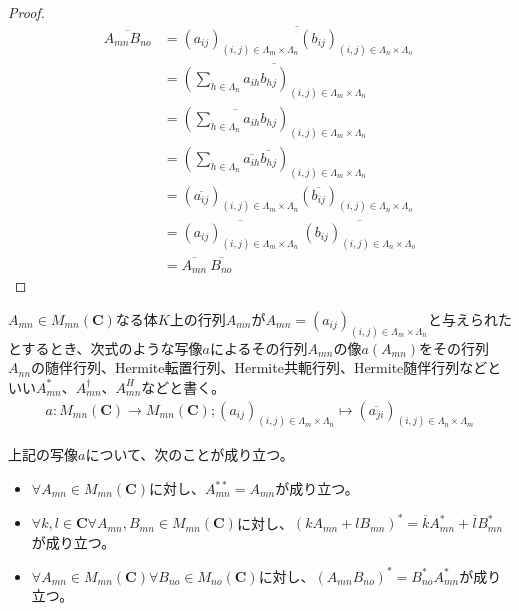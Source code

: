\documentclass[dvipdfmx]{jsarticle}
\begin{document}
\begin{proof}
\begin{align*}
\overline{A_{mn}B_{no}} &= \overline{\left( a_{ij} \right)_{(i,j) \in \varLambda_{m} \times \varLambda_{n}}\left( b_{ij} \right)_{(i,j) \in \varLambda_{n} \times \varLambda_{o}}}\\
&= \overline{\left( \sum_{h \in \varLambda_{n}} {a_{ih}b_{hj}} \right)_{(i,j) \in \varLambda_{m} \times \varLambda_{n}}}\\
&= \left( \overline{\sum_{h \in \varLambda_{n}} {a_{ih}b_{hj}}} \right)_{(i,j) \in \varLambda_{m} \times \varLambda_{n}}\\
&= \left( \sum_{h \in \varLambda_{n}} {\overline{a_{ih}}\overline{b_{hj}}} \right)_{(i,j) \in \varLambda_{m} \times \varLambda_{n}}\\
&= \left( \overline{a_{ij}} \right)_{(i,j) \in \varLambda_{m} \times \varLambda_{n}}\left( \overline{b_{ij}} \right)_{(i,j) \in \varLambda_{n} \times \varLambda_{o}}\\
&= \overline{\left( a_{ij} \right)_{(i,j) \in \varLambda_{m} \times \varLambda_{n}}}\ \overline{\left( b_{ij} \right)_{(i,j) \in \varLambda_{n} \times \varLambda_{o}}}\\
&= \overline{A_{mn}}\ \overline{B_{no}}
\end{align*}
\end{proof}
\begin{dfn}
$A_{mn} \in M_{mn}\left( \mathbf{C} \right)$なる体$K$上の行列$A_{mn}$が$A_{mn} = \left( a_{ij} \right)_{(i,j) \in \varLambda_{m} \times \varLambda_{n}}$と与えられたとするとき、次式のような写像$a$によるその行列$A_{mn}$の像$a\left( A_{mn} \right)$をその行列$A_{nn}$の随伴行列、Hermite転置行列、Hermite共軛行列、Hermite随伴行列などといい$A_{mn}^{*}$、$A_{mn}^{\dagger}$、$A_{mn}^{H}$などと書く。
\begin{align*}
a:M_{mn}\left( \mathbf{C} \right) \rightarrow M_{mn}\left( \mathbf{C} \right);\left( a_{ij} \right)_{(i,j) \in \varLambda_{m} \times \varLambda_{n}} \mapsto \left( \overline{a_{ji}} \right)_{(i,j) \in \varLambda_{n} \times \varLambda_{m}}
\end{align*}
\end{dfn}
\begin{thm}\label{2.1.3.10}
上記の写像$a$について、次のことが成り立つ。
\begin{itemize}
\item
  $\forall A_{mn} \in M_{mn}\left( \mathbf{C} \right)$に対し、$A_{mn}^{**} = A_{mn}$が成り立つ。
\item
  $\forall k,l \in \mathbf{C}\forall A_{mn},B_{mn} \in M_{mn}\left( \mathbf{C} \right)$に対し、$\left( kA_{mn} + lB_{mn} \right)^{*} = \overline{k}A_{mn}^{*} + \overline{l}B_{mn}^{*}$が成り立つ。
\item
  $\forall A_{mn} \in M_{mn}\left( \mathbf{C} \right)\forall B_{no} \in M_{no}\left( \mathbf{C} \right)$に対し、$\left( A_{mn}B_{no} \right)^{*} = B_{no}^{*}A_{mn}^{*}$が成り立つ。
\end{itemize}
\end{thm}
\end{document}
